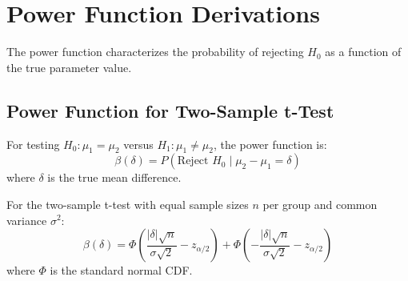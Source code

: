 \section{Power Function Derivations}

The power function characterizes the probability of rejecting $H_0$ as a function of the true parameter value.

\subsection{Power Function for Two-Sample t-Test}

\begin{definition}
For testing $H_0: \mu_1 = \mu_2$ versus $H_1: \mu_1 \neq \mu_2$, the power function is:
\begin{equation}
\beta(\delta) = P(\text{Reject } H_0 \mid \mu_2 - \mu_1 = \delta)
\end{equation}
where $\delta$ is the true mean difference.
\end{definition}

\begin{theorem}
For the two-sample t-test with equal sample sizes $n$ per group and common variance $\sigma^2$:
\begin{equation}
\beta(\delta) = \Phi\left(\frac{|\delta|\sqrt{n}}{\sigma\sqrt{2}} - z_{\alpha/2}\right) + \Phi\left(-\frac{|\delta|\sqrt{n}}{\sigma\sqrt{2}} - z_{\alpha/2}\right)
\end{equation}
where $\Phi$ is the standard normal CDF.
\end{theorem}

